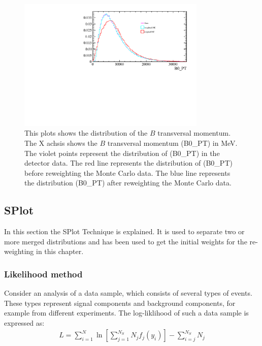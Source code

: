 \documentclass[english]{uzhpub}
\begin{document}
\begin{figure}[H]
\centering
\includegraphics[width=0.8\textwidth]{Reweighting/B0_PT}
\caption{This plots shows the distribution of the $B$ transversal momentum. The X achsis shows the $B$ transversal momentum (B0\_PT) in MeV. The violet points represent the distribution of (B0\_PT) in the detector data.
The red line represents the distribution of (B0\_PT) before reweighting the Monte Carlo data.
The blue line represents the distribution (B0\_PT) after reweighting the Monte Carlo data. }
\label{fig:B0_PT}
\end{figure}




 \subsection{SPlot}
In this section the SPlot Technique is explained. It is used to separate two or more merged distributions and  has been used to get the initial weights for the re-weighting in this chapter.

 \subsubsection{Likelihood method}
 Consider an analysis of a data sample, which consists of several types of events. These types represent signal components and background components, for example from different experiments. The log-liklihood of such a data sample is expressed as:
 \begin{align}
  L = \sum_{i=1}^{N} \ln \left[ \sum_{j=1}^{N_S} N_j f_j (y_i) \right] - \sum_{i=j}^{N_S} N_j \label{eq:L}
 \end{align}
\end{document}
